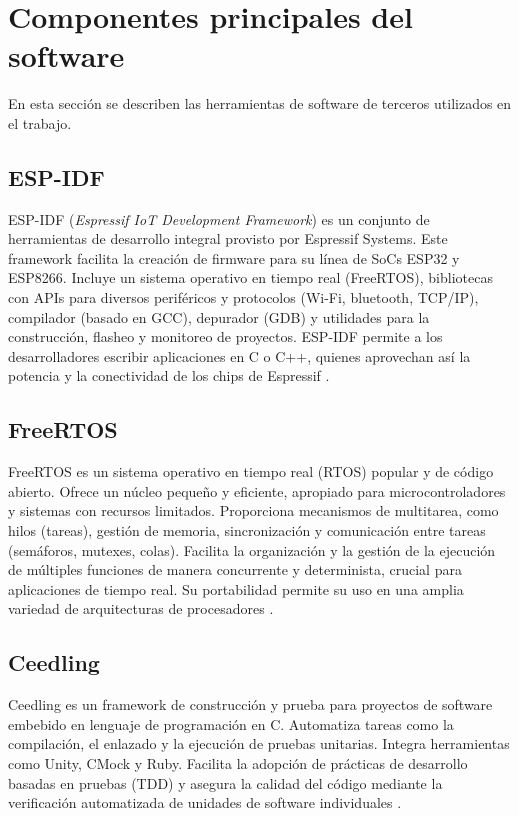

\section{Componentes principales del software}
\label{sec:sw:components}
En esta sección se describen las herramientas de software de terceros utilizados en el trabajo.


\subsection{ESP-IDF}

ESP-IDF (\textit{Espressif IoT Development Framework}) es un conjunto de herramientas de desarrollo integral provisto por Espressif Systems. Este framework facilita la creación de firmware para su línea de SoCs ESP32 y ESP8266. Incluye un sistema operativo en tiempo real (FreeRTOS), bibliotecas con APIs para diversos periféricos y protocolos (Wi-Fi, bluetooth, TCP/IP), compilador (basado en GCC), depurador (GDB) y utilidades para la construcción, flasheo y monitoreo de proyectos. ESP-IDF permite a los desarrolladores escribir aplicaciones en C o C++, quienes aprovechan así la potencia y la conectividad de los chips de Espressif \cite{ESPIDF}.


\subsection{FreeRTOS}

FreeRTOS es un sistema operativo en tiempo real (RTOS) popular y de código abierto. Ofrece un núcleo pequeño y eficiente, apropiado para microcontroladores y sistemas con recursos limitados. Proporciona mecanismos de multitarea, como hilos (tareas), gestión de memoria, sincronización y comunicación entre tareas (semáforos, mutexes, colas). Facilita la organización y la gestión de la ejecución de múltiples funciones de manera concurrente y determinista, crucial para aplicaciones de tiempo real. Su portabilidad permite su uso en una amplia variedad de arquitecturas de procesadores \cite{FREERTOS}.

\subsection{Ceedling}

Ceedling es un framework de construcción y prueba para proyectos de software embebido en lenguaje de programación en C. Automatiza tareas como la compilación, el enlazado y la ejecución de pruebas unitarias. Integra herramientas como Unity, CMock y Ruby. Facilita la adopción de prácticas de desarrollo basadas en pruebas (TDD) y asegura la calidad del código mediante la verificación automatizada de unidades de software individuales \cite{CEEDLING}.

